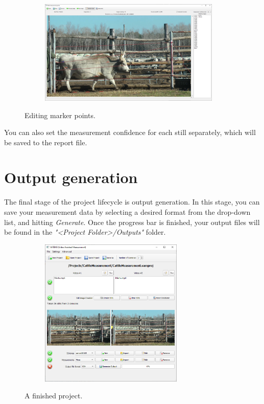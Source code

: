 \documentclass[10pt,a4paper,oneside]{report}             %
\begin{document}
\begin{figure}[H]
	\centering
	\begin{subfigure}{\textwidth}
		\centering 
		\includegraphics[width=0.95\textwidth]{./images/MeasWSel.png}
	\end{subfigure}
	\caption[]
	{\small  Editing marker points.}
\end{figure} 

You can also set the measurement confidence for each still separately, which will be saved to the report file.

\section{Output generation}

The final stage of the project lifecycle is output generation. In this stage, you can save your measurement data by selecting a desired format from the drop-down list, and hitting \textit{Generate}. Once the progress bar is finished, your output files will be found in the \textit{"<Project Folder>/Outputs"} folder.


\begin{figure}[H]
	\centering
	\begin{subfigure}{\textwidth}
		\centering 
		\includegraphics[width=0.75\textwidth]{./images/MWFin.png}
	\end{subfigure}
	\caption[]
	{\small  A finished project.}
\end{figure} 
\end{document}
